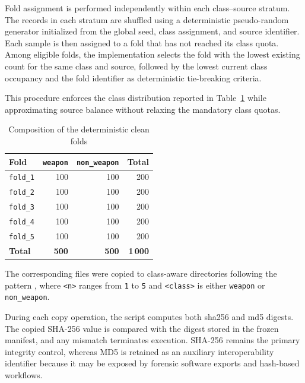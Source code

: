 Fold assignment is performed independently within each class--source stratum.
The records in each stratum are shuffled using a deterministic pseudo-random
generator initialized from the global seed, class assignment, and source
identifier. Each sample is then assigned to a fold that has not reached its
class quota. Among eligible folds, the implementation selects the fold with the
lowest existing count for the same class and source, followed by the lowest
current class occupancy and the fold identifier as deterministic tie-breaking
criteria.

This procedure enforces the class distribution reported in
Table~\ref{tab:implementation-clean-fold-composition} while approximating source
balance without relaxing the mandatory class quotas.

\begin{table}[H]
\centering
\small
\renewcommand{\arraystretch}{1.15}
\setlength{\tabcolsep}{6pt}
\caption{Composition of the deterministic clean folds}
\label{tab:implementation-clean-fold-composition}
\begin{tabular}{@{}l r r r@{}}
\toprule
\textbf{Fold} &
\textbf{\texttt{weapon}} &
\textbf{\texttt{non\_weapon}} &
\textbf{Total} \\
\midrule

\texttt{fold\_1}
& 100
& 100
& 200 \\

\texttt{fold\_2}
& 100
& 100
& 200 \\

\texttt{fold\_3}
& 100
& 100
& 200 \\

\texttt{fold\_4}
& 100
& 100
& 200 \\

\texttt{fold\_5}
& 100
& 100
& 200 \\

\midrule
\textbf{Total}
& \textbf{500}
& \textbf{500}
& \textbf{1\,000} \\

\bottomrule
\end{tabular}
\end{table}

The corresponding files were copied to class-aware directories following the
pattern
, where
\texttt{<n>} ranges from \texttt{1} to \texttt{5} and
\texttt{<class>} is either \texttt{weapon} or
\texttt{non\_weapon}.

During each copy operation, the script computes both \gls{sha256} and
\gls{md5} digests. The copied SHA-256 value is compared with the digest stored
in the frozen manifest, and any mismatch terminates execution. SHA-256 remains
the primary integrity control, whereas MD5 is retained as an auxiliary
interoperability identifier because it may be exposed by forensic software
exports and hash-based workflows.

